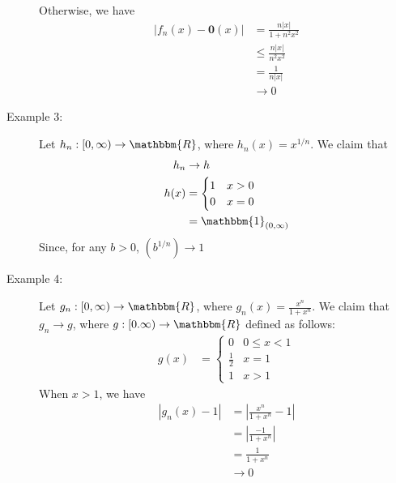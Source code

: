 \documentclass[10pt]{extarticle}
\renewcommand{\mathbf}[1]{\mathbold{#1}}
\newcommand{\R}{\mathbbm{R}}
\begin{document}
\begin{description}
        Otherwise, we have
        \begin{align*}
          \left|f_n(x) - \mathbf{0}(x)\right| &= \frac{n|x|}{1 + n^2x^2}\\
                                              &\leq \frac{n|x|}{n^2x^2}\\
                                              &= \frac{1}{n|x|}\\
                                              &\rightarrow 0
        \end{align*}
      \item[Example 3:] Let $h_n: [0,\infty)\rightarrow \R$, where $h_n(x) = x^{1/n}$. We claim that
        \begin{align*}
          h_{n} &\rightarrow h\\
          h(x) &= \begin{cases}
            1 & x > 0\\
            0 & x = 0
          \end{cases}\\
               &= \mathbbm{1}_{(0,\infty)}
        \end{align*}
        Since, for any $b > 0$, $\left(b^{1/n}\right)\rightarrow 1$
      \item[Example 4:] Let $g_n: [0,\infty) \rightarrow \R$, where $g_n(x) = \frac{x^n}{1 + x^n}$. We claim that $g_n \rightarrow g$, where $g: [0.\infty) \rightarrow \R$ defined as follows:
        \begin{align*}
          g(x) &= \begin{cases}
            0 & 0 \leq x < 1\\
            \frac{1}{2} & x = 1\\
            1 & x > 1
          \end{cases}
        \end{align*}
        When $x > 1$, we have
        \begin{align*}
          \left|g_n(x) - 1\right| &= \left|\frac{x^n}{1 + x^n} - 1\right|\\
                                  &= \left|\frac{-1}{1 + x^n}\right|\\
                                  &= \frac{1}{1+x^n}\\
                                  &\rightarrow 0
        \end{align*}
    \end{description}
\end{document}
